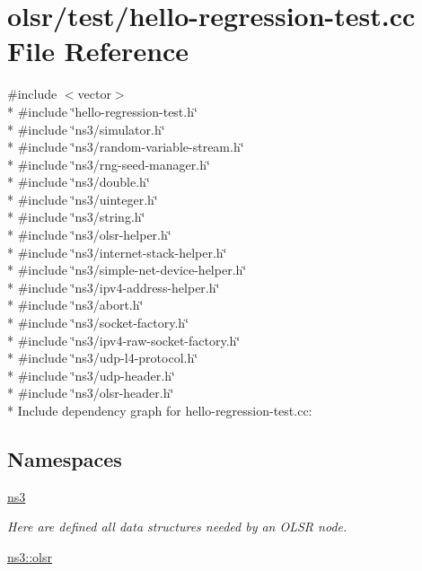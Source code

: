 \hypertarget{hello-regression-test_8cc}{}\section{olsr/test/hello-\/regression-\/test.cc File Reference}
\label{hello-regression-test_8cc}
{\ttfamily \#include $<$vector$>$}\\*
{\ttfamily \#include \char`\"{}hello-\/regression-\/test.\+h\char`\"{}}\\*
{\ttfamily \#include \char`\"{}ns3/simulator.\+h\char`\"{}}\\*
{\ttfamily \#include \char`\"{}ns3/random-\/variable-\/stream.\+h\char`\"{}}\\*
{\ttfamily \#include \char`\"{}ns3/rng-\/seed-\/manager.\+h\char`\"{}}\\*
{\ttfamily \#include \char`\"{}ns3/double.\+h\char`\"{}}\\*
{\ttfamily \#include \char`\"{}ns3/uinteger.\+h\char`\"{}}\\*
{\ttfamily \#include \char`\"{}ns3/string.\+h\char`\"{}}\\*
{\ttfamily \#include \char`\"{}ns3/olsr-\/helper.\+h\char`\"{}}\\*
{\ttfamily \#include \char`\"{}ns3/internet-\/stack-\/helper.\+h\char`\"{}}\\*
{\ttfamily \#include \char`\"{}ns3/simple-\/net-\/device-\/helper.\+h\char`\"{}}\\*
{\ttfamily \#include \char`\"{}ns3/ipv4-\/address-\/helper.\+h\char`\"{}}\\*
{\ttfamily \#include \char`\"{}ns3/abort.\+h\char`\"{}}\\*
{\ttfamily \#include \char`\"{}ns3/socket-\/factory.\+h\char`\"{}}\\*
{\ttfamily \#include \char`\"{}ns3/ipv4-\/raw-\/socket-\/factory.\+h\char`\"{}}\\*
{\ttfamily \#include \char`\"{}ns3/udp-\/l4-\/protocol.\+h\char`\"{}}\\*
{\ttfamily \#include \char`\"{}ns3/udp-\/header.\+h\char`\"{}}\\*
{\ttfamily \#include \char`\"{}ns3/olsr-\/header.\+h\char`\"{}}\\*
Include dependency graph for hello-\/regression-\/test.cc\+:
\subsection*{Namespaces}
\begin{DoxyCompactItemize}
\item 
 \hyperlink{namespacens3}{ns3}
\begin{DoxyCompactList}\small\item\em Here are defined all data structures needed by an O\+L\+SR node. \end{DoxyCompactList}\item 
 \hyperlink{namespacens3_1_1olsr}{ns3\+::olsr}
\end{DoxyCompactItemize}
